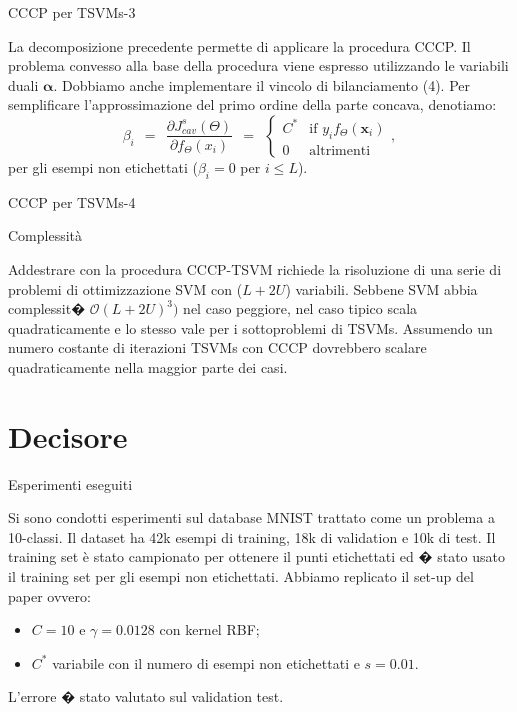 \documentclass[mathserif]{beamer}
\begin{document}
\begin{frame}{CCCP per TSVMs-3}
\begin{block}{}
La decomposizione precedente permette di applicare la procedura CCCP. Il problema convesso alla base della procedura viene espresso utilizzando le variabili duali $\boldsymbol\alpha$. Dobbiamo anche implementare il vincolo di bilanciamento (4). 
Per semplificare l'approssimazione del primo ordine della parte concava, denotiamo:
\begin{equation}
\beta_i\ \  =\ \ 	\frac{\partial J_{cav}^{s}(\Theta)}{\partial f_{\Theta}(x_i)} \ \  = \ \ 
\begin{cases} 
C^* & \text{if } y_if_\Theta(\textbf{x}_i) \\
0 & \text{altrimenti }
\end{cases},
\end{equation}
per gli esempi non etichettati ($\beta_i=0$ per $i \leq L$).
\end{block}
\end{frame}


\begin{frame}{CCCP per TSVMs-4}
\end{frame}

\begin{frame}{Complessit\`a}
\begin{block}{}
Addestrare con la procedura CCCP-TSVM richiede la risoluzione di una serie di problemi di ottimizzazione SVM con ($L+2U$) variabili. Sebbene SVM abbia complessit� $ \mathcal{O} (L+2U)^3)$ nel caso peggiore, nel caso tipico scala quadraticamente e lo stesso vale per i sottoproblemi di TSVMs. Assumendo un numero costante di iterazioni TSVMs con CCCP dovrebbero scalare quadraticamente nella maggior parte dei casi.
\end{block}
\end{frame}


\section{Decisore}

\begin{frame}{Esperimenti eseguiti}
\begin{block}{}
Si sono condotti esperimenti sul database MNIST trattato come un problema a 10-classi. Il dataset ha 42k esempi di training, 18k di validation e 10k di test. Il training set è stato campionato per ottenere il punti etichettati ed � stato usato il training set per gli esempi non etichettati. Abbiamo replicato il set-up del paper ovvero:
\begin{itemize}
	\item <1-> $C=10$ e $\gamma = 0.0128$ con kernel RBF;
	\item <1-> $C^*$ variabile con il numero di esempi non etichettati e $s=0.01$.
\end{itemize}
L'errore � stato valutato sul validation test.
\end{block}
\end{frame}
\end{document}
